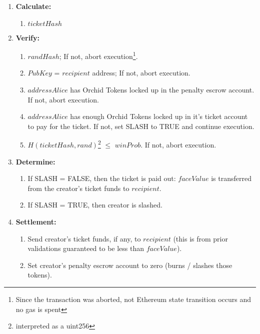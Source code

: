 \begin{enumerate}
  \item[] \textbf{Calculate:} \begin{enumerate}
		\item $ticketHash$ %
  \end{enumerate}

  \item[] \textbf{Verify:} \begin{enumerate}
  	\item $randHash$; If not, abort execution\footnote{Since the transaction was aborted, not Ethereum state transition occurs and no gas is spent}. %
    \item $PubKey$ = $recipient$ address; If not, abort execution.
  \item $addressAlice$ has Orchid Tokens locked up in the penalty escrow account. If not, abort execution.
  \item $addressAlice$ has enough Orchid Tokens locked up in it's ticket account to pay for the ticket. If not, set SLASH to TRUE and continue execution.
  \item $H(ticketHash, rand)$\footnote{interpreted as a uint256} $\leq$ $winProb$. If not, abort execution.
  \end{enumerate}

  \item[] \textbf{Determine:} \begin{enumerate}
  	\item If SLASH = FALSE, then the ticket is paid out: $faceValue$ is transferred from the creator's ticket funds to $recipient$.
  	\item If SLASH = TRUE, then creator is slashed.
  \end{enumerate}

  \item[] \textbf{Settlement:} \begin{enumerate}
  	\item Send creator's ticket funds, if any, to $recipient$ (this is from prior validations guaranteed to be less than $faceValue$).
  	\item Set creator's penalty escrow account to zero (burns / slashes those tokens).
  \end{enumerate}

\end{enumerate}

